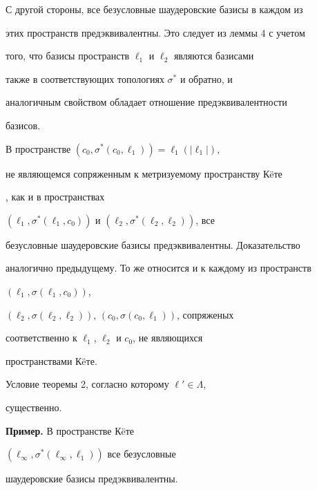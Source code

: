 С другой стороны, все безусловные шаудеровские базисы в каждом из


этих пространств предэквивалентны. Это следует из леммы 4 с учетом


того, что базисы пространств $\ell_1$ и $\ell_2$ являются базисами


также в соответствующих топологиях $\sigma^*$ и обратно, и


аналогичным свойством обладает отношение предэквивалентности


базисов.





\begin{note}


В пространстве $(c_0,\sigma^*(c_0,\ell_1))=\ell_1(|\ell_1|)$,


не являющемся сопряженным к метризуемому пространству К\"eте


\cite{14Kir}, как и в пространствах


$(\ell_1,\sigma^*(\ell_1,c_0))$ и $(\ell_2,\sigma^*(\ell_2,\ell_2))$, все


безусловные шаудеровские базисы предэквивалентны. Доказательство


аналогично предыдущему. То же относится и к каждому из пространств


$(\ell_1,\sigma(\ell_1,c_0))$,


$(\ell_2,\sigma(\ell_2,\ell_2))$, $(c_0,\sigma(c_0,\ell_1))$, сопряженых


соответственно к $\ell_1$, $\ell_2$ и $c_0$, не являющихся


пространствами К\"eте.


\end{note}





\begin{note}


Условие теоремы 2, согласно которому $\ell'\in\Lambda$,


существенно.


\end{note}





{\bf Пример.} В пространстве К\"eте


$(\ell_\infty,\sigma^*(\ell_\infty,\ell_1))$ все безусловные


шаудеровские базисы предэквивалентны.


\medskip





